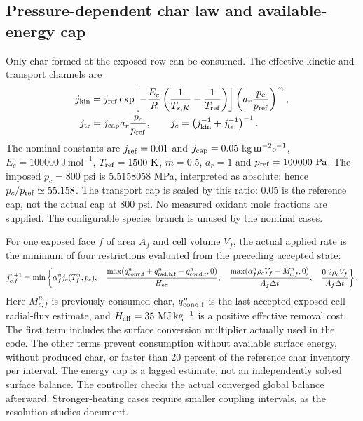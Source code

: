 \subsection{Pressure-dependent char law and available-energy cap}
Only char formed at the exposed row can be consumed. The effective kinetic and transport channels are
\begin{align}
 j_{\rm kin}&=j_{\rm ref}\exp\!\left[-\frac{E_c}{R}\left(\frac1{T_{s,K}}-\frac1{T_{\rm ref}}\right)\right]
 \left(a_r\frac{p_c}{p_{\rm ref}}\right)^m,\\
 j_{\rm tr}&=j_{\rm cap}a_r\frac{p_c}{p_{\rm ref}},\qquad
 j_c=\left(j_{\rm kin}^{-1}+j_{\rm tr}^{-1}\right)^{-1}.
\end{align}
The nominal constants are $j_{\rm ref}=0.01$ and $j_{\rm cap}=0.05\ \mathrm{kg\,m^{-2}s^{-1}}$, $E_c=100000\ \mathrm{J\,mol^{-1}}$, $T_{\rm ref}=1500\ \mathrm K$, $m=0.5$, $a_r=1$ and $p_{\rm ref}=100000\ \mathrm{Pa}$. The imposed $p_c=800$ psi is $5.5158058$ MPa, interpreted as absolute; hence $p_c/p_{\rm ref}\simeq55.158$. The transport cap is scaled by this ratio: 0.05 is the reference cap, not the actual cap at 800 psi. No measured oxidant mole fractions are supplied. The configurable species branch is unused by the nominal cases.

For one exposed face $f$ of area $A_f$ and cell volume $V_f$, the actual applied rate is the minimum of four restrictions evaluated from the preceding accepted state:
\begin{equation}\label{eq:char-cap}
 j_{c,f}^{n+1}=\min\left\{\alpha_f^n j_c(T_f^n,p_c),\quad
 \frac{\max(q_{\rm conv,f}^{n}+q_{\rm rad,h,f}^{n}-q_{\rm cond,f}^{n},0)}{H_{\rm eff}},\quad
 \frac{\max(\alpha_f^n\rho_cV_f-M_{c,f}^n,0)}{A_f\Delta t},\quad
 \frac{0.2\rho_cV_f}{A_f\Delta t}\right\}.
\end{equation}
Here $M_{c,f}^n$ is previously consumed char, $q_{\rm cond,f}^{n}$ is the last accepted exposed-cell radial-flux estimate, and $H_{\rm eff}=35\ \mathrm{MJ\,kg^{-1}}$ is a positive effective removal cost. The first term includes the surface conversion multiplier actually used in the code. The other terms prevent consumption without available surface energy, without produced char, or faster than 20 percent of the reference char inventory per interval. The energy cap is a lagged estimate, not an independently solved surface balance. The controller checks the actual converged global balance afterward. Stronger-heating cases require smaller coupling intervals, as the resolution studies document.

